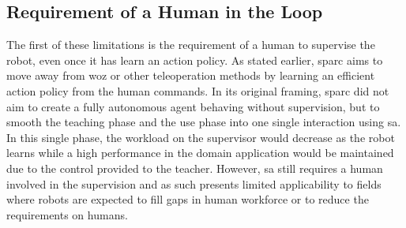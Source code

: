 \subsection{Requirement of a Human in the Loop}

The first of these limitations is the requirement of a human to supervise the robot, even once it has learn an action policy. As stated earlier, \gls{sparc} aims to move away from \gls{woz} or other teleoperation methods by learning an efficient action policy from the human commands. In its original framing, \gls{sparc} did not aim to create a fully autonomous agent behaving without supervision, but to smooth the teaching phase and the use phase into one single interaction using \gls{sa}. In this single phase, the workload on the supervisor would decrease as the robot learns while a high performance in the domain application would be maintained due to the control provided to the teacher. However, \gls{sa} still requires a human involved in the supervision and as such presents limited applicability to fields where robots are expected to fill gaps in human workforce or to reduce the requirements on humans. 


